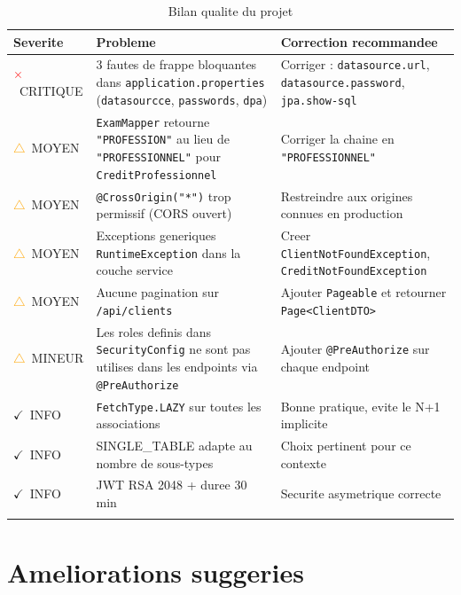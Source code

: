 \documentclass[12pt,a4paper]{report}
\newcommand{\OK}{\textcolor{green!60!black}{$\checkmark$}}
\newcommand{\WARN}{\textcolor{orange}{$\triangle$}}
\newcommand{\ERR}{\textcolor{red}{$\times$}}
\begin{document}
\begin{longtable}{l p{4.8cm} p{5cm}}
\toprule
\textbf{Severite} & \textbf{Probleme} & \textbf{Correction recommandee} \\
\midrule
\endhead

\ERR\ CRITIQUE
    & 3 fautes de frappe bloquantes dans \texttt{application.properties}
      (\texttt{datasourcce}, \texttt{passwords}, \texttt{dpa})
    & Corriger : \texttt{datasource.url}, \texttt{datasource.password},
      \texttt{jpa.show-sql} \\[6pt]

\WARN\ MOYEN
    & \texttt{ExamMapper} retourne \texttt{"PROFESSION"} au lieu de
      \texttt{"PROFESSIONNEL"} pour \texttt{CreditProfessionnel}
    & Corriger la chaine en \texttt{"PROFESSIONNEL"} \\[6pt]

\WARN\ MOYEN
    & \texttt{@CrossOrigin("*")} trop permissif (CORS ouvert)
    & Restreindre aux origines connues en production \\[6pt]

\WARN\ MOYEN
    & Exceptions generiques \texttt{RuntimeException} dans la couche service
    & Creer \texttt{ClientNotFoundException}, \texttt{CreditNotFoundException} \\[6pt]

\WARN\ MOYEN
    & Aucune pagination sur \texttt{/api/clients}
    & Ajouter \texttt{Pageable} et retourner \texttt{Page<ClientDTO>} \\[6pt]

\WARN\ MINEUR
    & Les roles definis dans \texttt{SecurityConfig} ne sont pas utilises
      dans les endpoints via \texttt{@PreAuthorize}
    & Ajouter \texttt{@PreAuthorize} sur chaque endpoint \\[6pt]

\OK\ INFO
    & \texttt{FetchType.LAZY} sur toutes les associations
    & Bonne pratique, evite le N+1 implicite \\[6pt]

\OK\ INFO
    & SINGLE\_TABLE adapte au nombre de sous-types
    & Choix pertinent pour ce contexte \\[6pt]

\OK\ INFO
    & JWT RSA 2048 + duree 30 min
    & Securite asymetrique correcte \\

\bottomrule
\caption{Bilan qualite du projet}
\end{longtable}

\section{Ameliorations suggeries}
\end{document}
